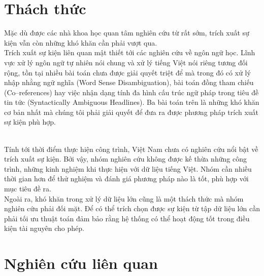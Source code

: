  \section{Thách thức}
   \noindent  Mặc dù được các nhà khoa học quan tâm nghiên cứu  từ rất sớm, trích xuất sự kiện vẫn còn những khó khăn cần phải vượt qua. \\
\noindent Trích xuất sự kiện liên quan mật thiết tới các nghiên cứu về ngôn ngữ học. Lĩnh vực xử lý ngôn ngữ tự nhiên nói chung và xử lý tiếng Việt nói riêng tương đối rộng, tồn tại nhiều bài toán chưa được giải quyết triệt để mà trong đó có  xử lý nhập nhằng ngữ nghĩa (Word Sense Disambiguation), bài toán đồng tham chiếu (Co--references) hay việc nhận dạng tính đa hình cấu trúc ngữ pháp trong tiêu đề tin tức (Syntactically  Ambiguous Headlines). Ba bài toán trên là những khó khăn cơ bản nhất mà chúng tôi phải giải quyết để đưa ra được phương pháp trích xuất sự kiện phù hợp.

\\
\noindent Tính tới thời điểm thực hiện công trình, Việt Nam chưa có nghiên cứu nổi bật về trích xuất sự kiện. Bởi vậy, nhóm nghiên cứu không được kế thừa những công trình, những kinh nghiệm khi thực hiện với dữ liệu tiếng Việt. Nhóm cần nhiều thời gian hơn để thử nghiệm và đánh giá phương pháp nào là tốt, phù hợp với mục tiêu đề ra.
\\
\noindent Ngoài ra, khó khăn trong xử lý dữ liệu lớn cũng là một thách thức mà nhóm nghiên cứu phải đối mặt. Để có thể trích chọn được sự kiện từ tập dữ liệu lớn cần phải tối ưu thuật toán đảm bảo rằng hệ thống có thể hoạt động tốt trong điều kiện tài nguyên cho phép.


\section{Nghiên cứu liên quan}
